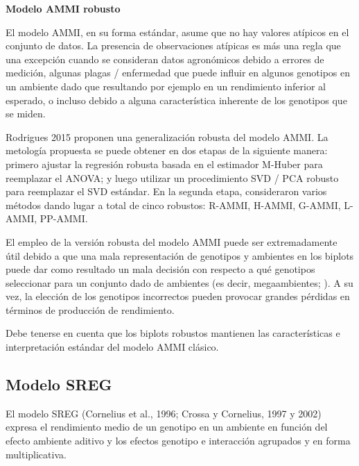 \textbf{Modelo AMMI robusto}

El modelo AMMI, en su forma estándar, asume que no hay valores atípicos en el conjunto de datos. La presencia de observaciones atípicas es más una regla que una excepción cuando se consideran datos agronómicos debido a errores de medición, algunas plagas / enfermedad que puede influir en algunos genotipos en un ambiente dado que resultando por ejemplo en un rendimiento inferior al esperado, o incluso debido a alguna característica inherente de los genotipos que se miden.

Rodrigues 2015 proponen una generalización robusta del modelo AMMI. La metología propuesta se puede obtener en dos etapas de la siguiente manera: primero ajustar la regresión robusta basada
en el estimador M-Huber \citep{Huber1981} para reemplazar el ANOVA; y luego utilizar un procedimiento SVD / PCA robusto para reemplazar el SVD estándar. En la segunda etapa, consideraron varios métodos dando lugar a total de cinco robustos: R-AMMI, H-AMMI, G-AMMI, L-AMMI, PP-AMMI. 

El empleo de la versión robusta del modelo AMMI puede ser extremadamente útil debido a que una mala representación de genotipos y ambientes en los biplots puede dar como resultado un mala decisión con respecto a qué genotipos seleccionar para un conjunto dado de ambientes (es decir, megaambientes; \citealp{Gauch1997,Yanetal2000}). A su vez, la elección de los genotipos incorrectos pueden provocar grandes pérdidas en términos de producción de rendimiento.

Debe tenerse en cuenta que los biplots robustos mantienen las características e interpretación estándar del modelo AMMI clásico.

\subsection{Modelo SREG}

El modelo SREG (Cornelius et al., 1996; Crossa y Cornelius, 1997 y 2002) expresa el rendimiento medio de un genotipo en un ambiente en función del efecto ambiente aditivo y los efectos genotipo e interacción agrupados y en forma multiplicativa.


